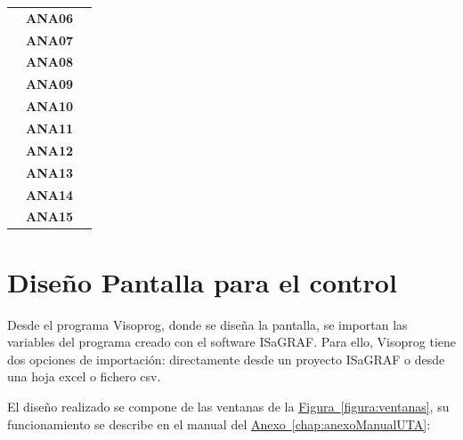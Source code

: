 \begin{center}
\begin{longtable}{|p{3cm}|p{3cm}|p{9cm}|}
      & \centering\textbf{ANA06} &  \\ \cline{2-2}
      & \centering\textbf{ANA07} &  \\ \cline{2-2}
      & \centering\textbf{ANA08} &  \\ \cline{2-2}
      & \centering\textbf{ANA09} &  \\ \cline{2-2}
      & \centering\textbf{ANA10} &  \\ \cline{2-2}
      & \centering\textbf{ANA11} &  \\ \cline{2-2}
      & \centering\textbf{ANA12} &  \\ \cline{2-2}
      & \centering\textbf{ANA13} &  \\ \cline{2-2}
      & \centering\textbf{ANA14} &  \\ \cline{2-2}
      & \centering\textbf{ANA15} &  \\ 
  \end{longtable}
  \end{center}

\section{Diseño Pantalla para el control}
\label{sec:programacionpantalla}
Desde el programa Visoprog, donde se diseña la pantalla, se importan las variables del programa creado con el software ISaGRAF. Para ello, Visoprog tiene dos opciones de importación: directamente desde un proyecto ISaGRAF o desde una hoja excel o fichero csv. 

El diseño realizado se compone de las ventanas de la \hyperref[figura:ventanas]{Figura~\ref{figura:ventanas}}, su funcionamiento se describe en el manual del \hyperref[chap:anexoManualUTA]{Anexo~\ref{chap:anexoManualUTA}}:

\begin{figure}[H]
  \centering
 \end{figure}

